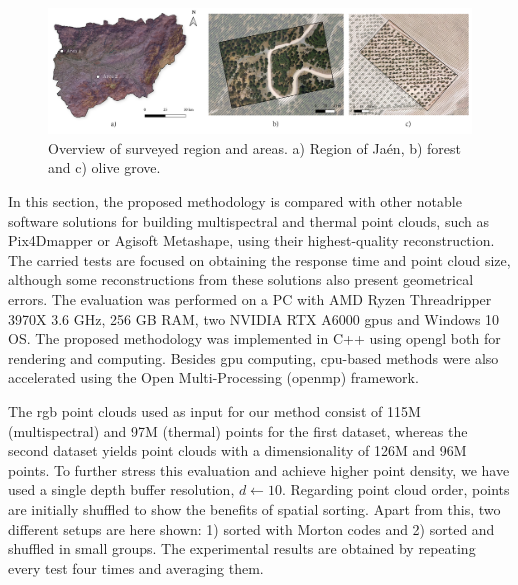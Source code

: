 \begin{figure}
    \centering
    \includegraphics[width=\linewidth]{figs/multi_thermal_projection/study area.png}
    \caption{Overview of surveyed region and areas. a) Region of Jaén, b) forest and c) olive grove. }
	\label{fig:occlusion_study_area}
\end{figure}

In this section, the proposed methodology is compared with other notable software solutions for building multispectral and thermal point clouds, such as Pix4Dmapper or Agisoft Metashape, using their highest-quality reconstruction. The carried tests are focused on obtaining the response time and point cloud size, although some reconstructions from these solutions also present geometrical errors. The evaluation was performed on a PC with AMD Ryzen Threadripper 3970X 3.6 GHz, 256 GB RAM, two NVIDIA RTX A6000 \acrshort{gpu}s and Windows 10 OS. The proposed methodology was implemented in C++ using \acrshort{opengl} both for rendering and computing. Besides \acrshort{gpu} computing, \acrshort{cpu}-based methods were also accelerated using the Open Multi-Processing (\acrshort{openmp}) framework.

The \acrshort{rgb} point clouds used as input for our method consist of 115M (multispectral) and 97M (thermal) points for the first dataset, whereas the second dataset yields point clouds with a dimensionality of 126M and 96M points. To further stress this evaluation and achieve higher point density, we have used a single depth buffer resolution, $d\gets 10$. Regarding point cloud order, points are initially shuffled to show the benefits of spatial sorting. Apart from this, two different setups are here shown: 1) sorted with Morton codes and 2) sorted and shuffled in small groups. The experimental results are obtained by repeating every test four times and averaging them. 


